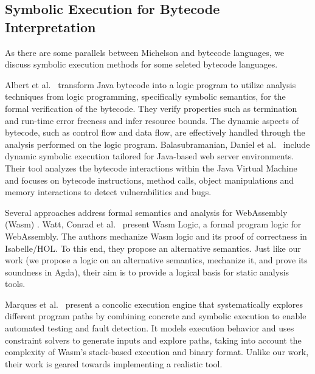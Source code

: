 


\subsection{Symbolic Execution for Bytecode Interpretation}
\label{sec:symb-exec-bytec}

As there are some parallels between Michelson and bytecode languages,
we discuss symbolic execution methods for some seleted bytecode languages.

Albert et al.~\cite{albert_et_al} transform Java bytecode into a logic
program to utilize analysis techniques from logic programming, specifically
symbolic semantics, for the formal verification of the bytecode. They
verify properties such as termination and run-time error freeness and infer
resource bounds. The dynamic aspects of
bytecode, such as control flow and data flow, are effectively handled
through the analysis performed on the logic program. Balasubramanian,
Daniel et al.~\cite{daniel_et_al} include dynamic symbolic execution tailored for
Java-based web server environments. Their tool
analyzes the bytecode interactions within the Java Virtual Machine and
focuses on bytecode instructions, method calls, object manipulations
and memory interactions to detect vulnerabilities and bugs. 

Several approaches address formal semantics and analysis for
WebAssembly (Wasm)
\cite{marques_et_al,lehmann_el_at,watt_et_al}. Watt, Conrad et
al.~\cite{watt_et_al} present Wasm Logic, a formal program logic
for WebAssembly. The authors mechanize
Wasm logic and its proof of correctness in Isabelle/HOL. To this end,
they propose an alternative semantics.
Just like our work (we propose a logic on an alternative semantics,
mechanize it, and prove its soundness in Agda), their aim is to provide a logical basis for static
analysis tools.

Marques et al.~\cite{marques_et_al} present a concolic execution engine that systematically
explores different program paths by combining concrete and symbolic
execution to enable automated testing and fault detection. It models
execution behavior and uses constraint 
solvers to generate inputs and explore paths, taking into account the
complexity of Wasm's stack-based execution and binary format. 
Unlike our work, their work is geared towards implementing a realistic tool.

